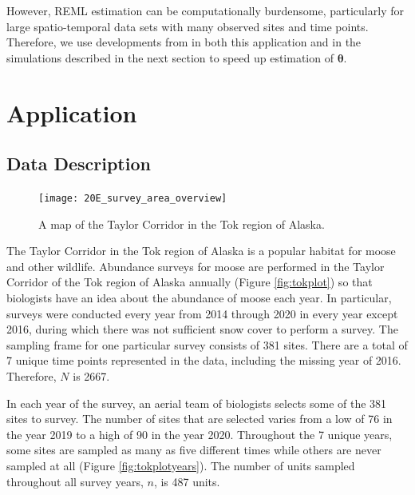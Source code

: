 \documentclass[]{interact}
\theoremstyle{plain}%
\theoremstyle{definition}
\theoremstyle{remark}
\begin{document}
However, REML estimation can be computationally burdensome, particularly
for large spatio-temporal data sets with many observed sites and time
points. Therefore, we use developments from \citet{dumelle2021linear} in
both this application and in the simulations described in the next
section to speed up estimation of \(\bm{\theta}\).

\section{Application} \label{section:Application}

\subsection{Data Description}

\begin{figure}
\texttt{[image: 20E\_survey\_area\_overview]} \caption{\label{fig:tokplot} A map of the Taylor Corridor in the Tok region of Alaska.}\label{fig:unnamed-chunk-2}
\end{figure}

The Taylor Corridor in the Tok region of Alaska is a popular habitat for
moose and other wildlife. Abundance surveys for moose are performed in
the Taylor Corridor of the Tok region of Alaska annually (Figure
\ref{fig:tokplot}) so that biologists have an idea about the abundance
of moose each year. In particular, surveys were conducted every year
from 2014 through 2020 in every year except 2016, during which there was
not sufficient snow cover to perform a survey. The sampling frame for
one particular survey consists of 381 sites. There are a total of 7
unique time points represented in the data, including the missing year
of 2016. Therefore, \(N\) is 2667.

In each year of the survey, an aerial team of biologists selects some of
the 381 sites to survey. The number of sites that are selected varies
from a low of 76 in the year 2019 to a high of 90 in the year 2020.
Throughout the 7 unique years, some sites are sampled as many as five
different times while others are never sampled at all (Figure
\ref{fig:tokplotyears}). The number of units sampled throughout all
survey years, \(n\), is 487 units.
\end{document}
